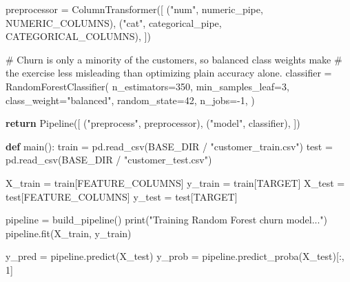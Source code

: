 \documentclass[
  indonesian,
  letterpaper,
  DIV=11,
  numbers=noendperiod]{scrreprt}
\newenvironment{Shaded}{\begin{snugshade}}{\end{snugshade}}
\newcommand{\BuiltInTok}[1]{\textcolor[rgb]{0.00,0.23,0.31}{#1}}
\newcommand{\CommentTok}[1]{\textcolor[rgb]{0.37,0.37,0.37}{#1}}
\newcommand{\ControlFlowTok}[1]{\textcolor[rgb]{0.00,0.23,0.31}{\textbf{#1}}}
\newcommand{\DecValTok}[1]{\textcolor[rgb]{0.68,0.00,0.00}{#1}}
\newcommand{\KeywordTok}[1]{\textcolor[rgb]{0.00,0.23,0.31}{\textbf{#1}}}
\newcommand{\NormalTok}[1]{\textcolor[rgb]{0.00,0.23,0.31}{#1}}
\newcommand{\OperatorTok}[1]{\textcolor[rgb]{0.37,0.37,0.37}{#1}}
\newcommand{\StringTok}[1]{\textcolor[rgb]{0.13,0.47,0.30}{#1}}
\begin{document}
\begin{Shaded}
\begin{Highlighting}[]
\NormalTok{    preprocessor }\OperatorTok{=}\NormalTok{ ColumnTransformer([}
\NormalTok{        (}\StringTok{"num"}\NormalTok{, numeric\_pipe, NUMERIC\_COLUMNS),}
\NormalTok{        (}\StringTok{"cat"}\NormalTok{, categorical\_pipe, CATEGORICAL\_COLUMNS),}
\NormalTok{    ])}

    \CommentTok{\# Churn is only a minority of the customers, so balanced class weights make}
    \CommentTok{\# the exercise less misleading than optimizing plain accuracy alone.}
\NormalTok{    classifier }\OperatorTok{=}\NormalTok{ RandomForestClassifier(}
\NormalTok{        n\_estimators}\OperatorTok{=}\DecValTok{350}\NormalTok{,}
\NormalTok{        min\_samples\_leaf}\OperatorTok{=}\DecValTok{3}\NormalTok{,}
\NormalTok{        class\_weight}\OperatorTok{=}\StringTok{"balanced"}\NormalTok{,}
\NormalTok{        random\_state}\OperatorTok{=}\DecValTok{42}\NormalTok{,}
\NormalTok{        n\_jobs}\OperatorTok{={-}}\DecValTok{1}\NormalTok{,}
\NormalTok{    )}

    \ControlFlowTok{return}\NormalTok{ Pipeline([}
\NormalTok{        (}\StringTok{"preprocess"}\NormalTok{, preprocessor),}
\NormalTok{        (}\StringTok{"model"}\NormalTok{, classifier),}
\NormalTok{    ])}


\KeywordTok{def}\NormalTok{ main():}
\NormalTok{    train }\OperatorTok{=}\NormalTok{ pd.read\_csv(BASE\_DIR }\OperatorTok{/} \StringTok{"customer\_train.csv"}\NormalTok{)}
\NormalTok{    test }\OperatorTok{=}\NormalTok{ pd.read\_csv(BASE\_DIR }\OperatorTok{/} \StringTok{"customer\_test.csv"}\NormalTok{)}

\NormalTok{    X\_train }\OperatorTok{=}\NormalTok{ train[FEATURE\_COLUMNS]}
\NormalTok{    y\_train }\OperatorTok{=}\NormalTok{ train[TARGET]}
\NormalTok{    X\_test }\OperatorTok{=}\NormalTok{ test[FEATURE\_COLUMNS]}
\NormalTok{    y\_test }\OperatorTok{=}\NormalTok{ test[TARGET]}

\NormalTok{    pipeline }\OperatorTok{=}\NormalTok{ build\_pipeline()}
    \BuiltInTok{print}\NormalTok{(}\StringTok{"Training Random Forest churn model..."}\NormalTok{)}
\NormalTok{    pipeline.fit(X\_train, y\_train)}

\NormalTok{    y\_pred }\OperatorTok{=}\NormalTok{ pipeline.predict(X\_test)}
\NormalTok{    y\_prob }\OperatorTok{=}\NormalTok{ pipeline.predict\_proba(X\_test)[:, }\DecValTok{1}\NormalTok{]}


\end{Highlighting}
\end{Shaded}
\end{document}

